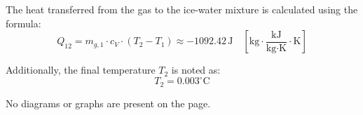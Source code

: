 The heat transferred from the gas to the ice-water mixture is calculated using the formula:  
\[
Q_{12} = m_{g,1} \cdot c_V \cdot (T_2 - T_1) \approx -1092.42 \, \text{J} \quad \left[ \text{kg} \cdot \frac{\text{kJ}}{\text{kg} \cdot \text{K}} \cdot \text{K} \right]
\]  

Additionally, the final temperature \( T_2 \) is noted as:  
\[
T_2 = 0.003^\circ \text{C}
\]  

No diagrams or graphs are present on the page.